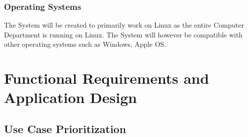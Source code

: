 \documentclass{article}
\begin{document}
	\subsubsection{Operating Systems}
		The System will be created to primarily work on Linux as the entire Computer Department is running on Linux. The System will however be compatible with other operating systems such as Windows, Apple OS.
		
		
	\cleardoublepage
	\section{Functional Requirements and Application Design}\label{sec:functional}
		\subsection{Use Case Prioritization}
\end{document}
